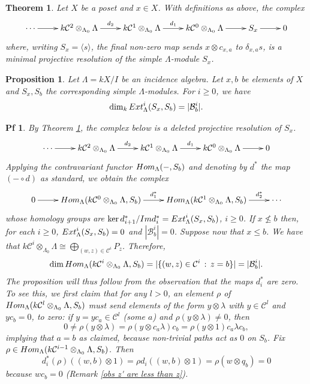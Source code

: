 \documentclass[10pt,a4paper]{amsart}
\newtheorem{teo}{Theorem}
\newtheorem{prop}{Proposition}
\newtheorem{pf}{Pf}
\newcommand{\B}{{\mathcal B}}
\newcommand{\C}{{\mathcal C}}
\newcommand{\Ext}{{\textnormal{Ext}}}
\newcommand{\Hom}{{\textnormal{Hom}}}
\newcommand{\im}{{\textnormal{Im }}}
\begin{document}
\begin{teo}\label{projectiveresolution}
Let $X$ be a poset and $x\in X$. With definitions as above, the complex
	$$\xymatrix@R=0.8em{ \cdots \ar[r] & k\C^2\otimes_{\Lambda_0}\Lambda\ar[r]^-{d_2} & k\C^{1}\otimes_{\Lambda_0}\Lambda\ar[r]^-{d_{1}} & k\C^{0}\otimes_{\Lambda_0}\Lambda\ar[r] & S_x\ar[r] & 0}$$
where, writing $S_x = \langle s\rangle$, the final non-zero map sends $x\otimes c_{x,a}$ to $\delta_{x,a}s$, is a minimal projective resolution of the simple $\Lambda$-module $S_x$.
\end{teo}

\begin{prop}\label{extgroups}
Let $\Lambda=kX/I$ be an incidence algebra. Let $x,b$ be elements of $X$ and $S_x,S_b$ the corresponding simple $\Lambda$-modules.  For $i\geqslant 0$, we have
	$$\dim_k\Ext_{\Lambda}^i(S_x,S_b) = |\B^{i}_b|.$$
\end{prop}

\begin{pf}
By Theorem \ref{projectiveresolution}, the complex below is a deleted projective resolution of $S_x$.
	$$\xymatrix@R=0.8em{ \cdots \ar[r] & k\C^2\otimes_{\Lambda_0}\Lambda\ar[r]^-{d_2} & k\C^{1}\otimes_{\Lambda_0}\Lambda\ar[r]^-{d_{1}} & k\C^{0}\otimes_{\Lambda_0}\Lambda\ar[r] & 0}$$ 	
Applying the contravariant functor $\Hom_{\Lambda}(-,S_b)$ and denoting by $d^*$ the map $(-\circ d)$ as standard, we obtain the complex
	$$\xymatrix@R=0.8em{ 0 \ar[r]& \Hom_{\Lambda}(k\C^{0}\otimes_{\Lambda_0}\Lambda,S_b) \ar[r]^-{d_{1}^*} & \Hom_{\Lambda}(k\C^{1}\otimes_{\Lambda_0}\Lambda,S_b) \ar[r]^-{d_{2}^*} & \cdots } $$
whose homology groups are $\ker d_{i+1}^*/\im d_{i}^* = \Ext_{\Lambda}^i(S_x,S_b)$, $i\geqslant 0$.  If $x\not\leqslant b$ then, for each $i\geqslant 0$, $\Ext_{\Lambda}^i(S_x,S_b) = 0$ and $|\B^{i}_b|=0$. Suppose now that $x\leqslant b$. We have that $k\C^i\otimes_{\Lambda_0}\Lambda\cong \bigoplus_{(w,z)\in \C^i} P_z$. Therefore, 
	$$\dim\Hom_{\Lambda}(k\C^{i}\otimes_{\Lambda_0}\Lambda,S_b) = |\{(w,z)\in \C^i\,:\,z=b\}| = |\B^i_b|.$$ 
The proposition will thus follow from the observation that the maps $d_i^*$ are zero.  To see this, we first claim that for any $l>0$, an element $\rho$ of $\Hom_{\Lambda}(k\C^{l}\otimes_{\Lambda_0}\Lambda,S_b)$ must send elements of the form $y\otimes \lambda$ with $y\in \C^l$ and $yc_b=0$, to zero: if $y = yc_a\in \mathcal{C}^l$ (some $a$) and $\rho(y\otimes \lambda)\neq 0$, then
$$0 \neq \rho (y\otimes \lambda) = \rho (y\otimes c_a\lambda)c_b = \rho(y\otimes 1)c_a\lambda c_b,$$
implying that $a = b$ as claimed, because non-trivial paths act as $0$ on $S_b$.  Fix $\rho\in \Hom_{\Lambda}(k\C^{i-1}\otimes_{\Lambda_0}\Lambda,S_b)$.  Then 
	$$d_i^*(\rho)((w,b)\otimes 1)=\rho d_i((w,b)\otimes 1) = \rho(w\otimes q_b) = 0$$
because $wc_b=0$ (Remark \ref{obs z' are less than z}).
\end{pf}
\end{document}
